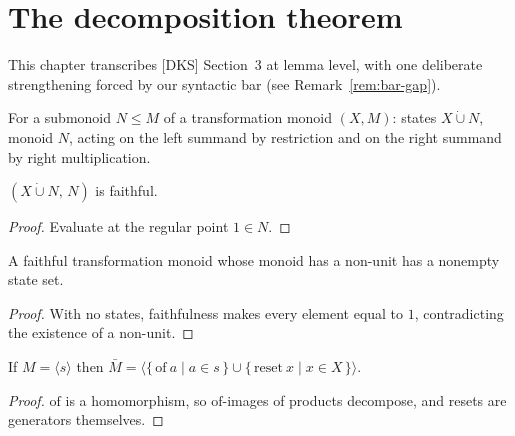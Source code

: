 \chapter{The decomposition theorem}\label{ch:decomposition}

This chapter transcribes [DKS] Section~3 at lemma level, with one
deliberate strengthening forced by our syntactic bar (see
Remark~\ref{rem:bar-gap}).

\begin{definition}\label{def:right-factor}
  \leanok
  For a submonoid $N \le M$ of a transformation monoid $(X, M)$:
  states $X \mathbin{\dot\cup} N$, monoid $N$, acting on the left
  summand by restriction and on the right summand by right
  multiplication.
\end{definition}

\begin{lemma}\label{lem:right-factor-faithful}
  \leanok
  $(X \mathbin{\dot\cup} N,\, N)$ is faithful.
\end{lemma}
\begin{proof}
  \leanok
  Evaluate at the regular point $1 \in N$.
\end{proof}

\begin{lemma}\label{lem:nonempty-of-nonunit}
  \leanok
  A faithful transformation monoid whose monoid has a non-unit has a
  nonempty state set.
\end{lemma}
\begin{proof}
  \leanok
  With no states, faithfulness makes every element equal to $1$,
  contradicting the existence of a non-unit.
\end{proof}

\begin{lemma}\label{lem:bar-generated}
  \leanok
  If $M = \langle s \rangle$ then
  $\bar M = \langle \{\,\mathrm{of}\ a \mid a \in s\,\} \cup
  \{\,\mathrm{reset}\ x \mid x \in X\,\}\rangle$.
\end{lemma}
\begin{proof}
  \leanok
  $\mathrm{of}$ is a homomorphism, so $\mathrm{of}$-images of products
  decompose, and resets are generators themselves.
\end{proof}

